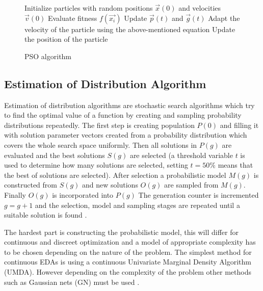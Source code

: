 \begin{figure}[h]
  \centering
  \begin{minipage}{12.5cm}
    \begin{algorithmic}
      \State Initialize particles with random positions $\vec{x}(0)$ and velocities $\vec{v}(0)$
      \Repeat
          \State Evaluate fitness $f(\vec{x_i})$
          \State Update $\vec{p}(t)$ and $\vec{g}(t)$
          \State Adapt the velocity of the particle using the above-mentioned equation
          \State Update the position of the particle
        \EndFor
    \end{algorithmic}
  \end{minipage}
  \caption{PSO algorithm}
  \label{algo:pso}
\end{figure}

\subsection{Estimation of Distribution Algorithm}

Estimation of distribution algorithms are stochastic search algorithms which try to find the optimal value of a function by creating and sampling probability distributions repeatedly. The first step is creating population $P(0)$ and filling it with solution parameter vectors created from a probability distribution which covers the whole search space uniformly. Then all solutions in $P(g)$ are evaluated and the best solutions $S(g)$ are selected (a threshold variable $t$ is used to determine how many solutions are selected, setting $t=50\%$ means that the best  of solutions are selected). After selection a probabilistic model $M(g)$ is constructed from $S(g)$ and new solutions $O(g)$ are sampled from $M(g)$. Finally $O(g)$ is incorporated into $P(g)$ The generation counter is incremented $g = g + 1$ and the selection, model and sampling stages are repeated until a suitable solution is found \cite{Hauschild2011111}.

The hardest part is constructing the probabilistic model, this will differ for continuous and discreet optimization and a model of appropriate complexity has to be chosen depending on the nature of the problem. The simplest method for continuous EDAs is using a continuous Univariate Marginal Density Algorithm (UMDA). However depending on the complexity of the problem other methods such as Gaussian nets (GN) must be used \cite{povsik2004estimation}.


